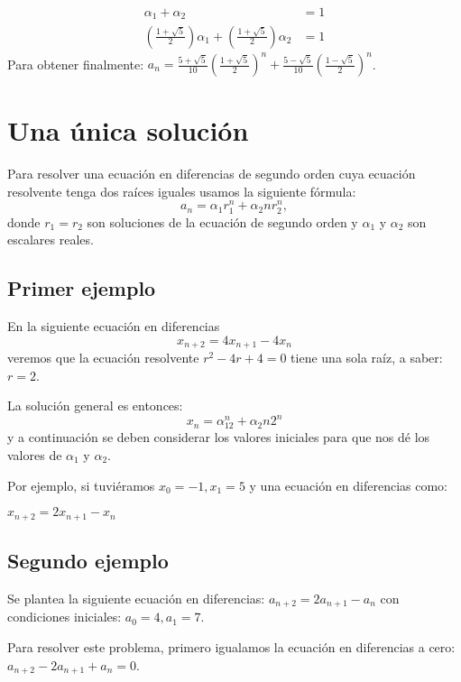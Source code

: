 \documentclass{report}
\begin{document}
\begin{align*}
\alpha_{1} + \alpha_{2} &= 1\\
(\frac{1+\sqrt{5}}{2})\alpha_{1} + (\frac{1+\sqrt{5}}{2})\alpha_{2}&=1
\end{align*}
Para obtener finalmente:
$a_{n}= \frac{5+\sqrt{5}}{10}(\frac{1+\sqrt{5}}{2})^n +
\frac{5-\sqrt{5}}{10}(\frac{1-\sqrt{5}}{2})^n$.

\section{Una única solución}
\label{sec:unica}

Para resolver una ecuación en diferencias de segundo orden cuya
ecuación resolvente tenga dos raíces iguales usamos la siguiente fórmula:
\begin{equation}
 \label{raicesiguales}
 a_n=\alpha_1r_1^n +\alpha_2nr_2^n,
\end{equation}
donde $r_1=r_2$ son soluciones de la ecuación de segundo orden y
$\alpha_1$ y $\alpha_2$ son escalares reales.

\subsection{Primer ejemplo}

En la siguiente ecuación en diferencias
\begin{equation}
  \label{eq:1}
  x_{n+2}=4x_{n+1}-4x_{n}
\end{equation}
veremos que la ecuación resolvente $r^2-4r+4=0$ tiene una sola raíz, a
saber: $r=2$.

La solución general es entonces:
$$x_n=\alpha_12^n+\alpha_2n2^n$$
y a continuación se deben considerar los valores iniciales para que
nos dé los valores de $\alpha_1$ y $\alpha_2$.

Por ejemplo, si tuviéramos $x_0=-1,x_1=5$ y una ecuación en diferencias como:

$x_{n+2}=2x_{n+1}-x_n$

\subsection{Segundo ejemplo}

Se plantea la siguiente ecuación en diferencias:
$a_{n+2}=2a_{n+1}-a_{n}$ con condiciones iniciales: $a_{0}=4, a_{1}=7$.

Para resolver este problema, primero igualamos la ecuación en diferencias a
cero: $a_{n+2}-2a_{n+1}+a_{n}=0$.
\end{document}

